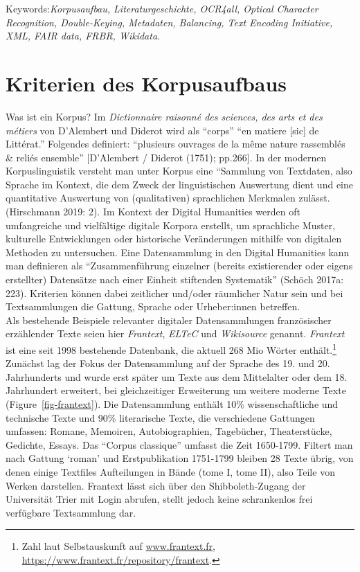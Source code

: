 \documentclass[
  12pt,
  letterpaper,
  DIV=11,
  numbers=noendperiod]{scrreprt}
\begin{document}
Keywords:\emph{Korpusaufbau, Literaturgeschichte, OCR4all, Optical
Character Recognition, Double-Keying, Metadaten, Balancing, Text
Encoding Initiative, XML, FAIR data, FRBR, Wikidata.}

\section{Kriterien des Korpusaufbaus}\label{kriterien-des-korpusaufbaus}

Was ist ein Korpus? Im \emph{Dictionnaire raisonné des sciences, des
arts et des métiers} von D'Alembert und Diderot wird als ``corps'' ``en
matiere {[}sic{]} de Littérat.'' Folgendes definiert: ``plusieurs
ouvrages de la même nature rassemblés \& reliés ensemble'' {[}D'Alembert
/ Diderot (1751); pp.266{]}. In der modernen Korpuslinguistik versteht
man unter Korpus eine ``Sammlung von Textdaten, also Sprache im Kontext,
die dem Zweck der linguistischen Auswertung dient und eine quantitative
Auswertung von (qualitativen) sprachlichen Merkmalen zulässt.
(Hirschmann 2019: 2). Im Kontext der Digital Humanities werden oft
umfangreiche und vielfältige digitale Korpora erstellt, um sprachliche
Muster, kulturelle Entwicklungen oder historische Veränderungen mithilfe
von digitalen Methoden zu untersuchen. Eine Datensammlung in den Digital
Humanities kann man definieren als ``Zusammenführung einzelner (bereits
existierender oder eigens erstellter) Datensätze nach einer Einheit
stiftenden Systematik'' (Schöch 2017a: 223). Kriterien können dabei
zeitlicher und/oder räumlicher Natur sein und bei Textsammlungen die
Gattung, Sprache oder Urheber:innen betreffen.\\
Als bestehende Beispiele relevanter digitaler Datensammlungen
französischer erzählender Texte seien hier \emph{Frantext}, \emph{ELTeC}
und \emph{Wikisource} genannt. \emph{Frantext} ist eine seit 1998
bestehende Datenbank, die aktuell 268 Mio Wörter enthält.\footnote{Zahl
  laut Selbstauskunft auf
  \href{http://www.frantext.fr}{www.frantext.fr},
  \url{https://www.frantext.fr/repository/frantext}.} Zunächst lag der
Fokus der Datensammlung auf der Sprache des 19. und 20. Jahrhunderts und
wurde erst später um Texte aus dem Mittelalter oder dem 18. Jahrhundert
erweitert, bei gleichzeitiger Erweiterung um weitere moderne Texte
(Figure~\ref{fig-frantext}). Die Datensammlung enthält 10\%
wissenschaftliche und technische Texte und 90\% literarische Texte, die
verschiedene Gattungen umfassen: Romane, Memoiren, Autobiographien,
Tagebücher, Theaterstücke, Gedichte, Essays. Das ``Corpus classique''
umfasst die Zeit 1650-1799. Filtert man nach Gattung `roman' und
Erstpublikation 1751-1799 bleiben 28 Texte übrig, von denen einige
Textfiles Aufteilungen in Bände (tome I, tome II), also Teile von Werken
darstellen. Frantext lässt sich über den Shibboleth-Zugang der
Universität Trier mit Login abrufen, stellt jedoch keine schrankenlos
frei verfügbare Textsammlung dar.
\end{document}

